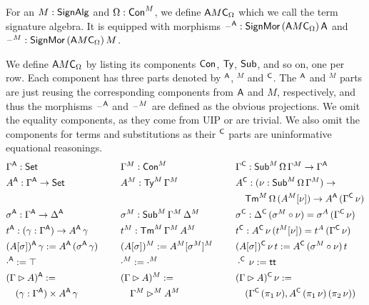 \documentclass[a4paper,UKenglish,cleveref, autoref]{lipics-v2019}
\begin{document}
\begin{definition}
  For an $M:\mathsf{SignAlg}$ and $\Omega:\mathsf{Con}^M$, we define ${\mathsf{A} M\mathsf{C}}_\Omega$
  which we call the term signature algebra. It is equipped with
  morphisms $\mathord{\hspace{1pt}\text{--}\hspace{1pt}}^{\mathsf{A}} : \mathsf{SignMor}\,({\mathsf{A} M\mathsf{C}}_\Omega)\,\mathsf{A}$ and
  $\mathord{\hspace{1pt}\text{--}\hspace{1pt}}^M : \mathsf{SignMor}\,({\mathsf{A} M\mathsf{C}}_\Omega)\,M$.

  We define ${\mathsf{A} M\mathsf{C}}_\Omega$ by listing its components $\mathsf{Con}$, $\mathsf{Ty}$,
  $\mathsf{Sub}$, and so on, one per row. Each component has three parts
  denoted by $^{\mathsf{A}}$, $^M$ and $^{\mathsf{C}}$. The $^{\mathsf{A}}$ and $^M$ parts are just
  reusing the corresponding components from $\mathsf{A}$ and $M$,
  respectively, and thus the morphisms $\mathord{\hspace{1pt}\text{--}\hspace{1pt}}^{\mathsf{A}}$ and $\mathord{\hspace{1pt}\text{--}\hspace{1pt}}^M$ are
  defined as the obvious projections. We omit the equality components,
  as they come from UIP or are trivial. We also omit the components
  for terms and substitutions as their $^{\mathsf{C}}$ parts are uninformative
  equational reasonings.
  \begin{alignat*}{10}
    & \Gamma^\A:\Set && \hspace{0.4em} && \Gamma^M:\Con^M && \hspace{0.4em} && \Gamma^\C: \Sub^M\,\Omega\,\Gamma^M\ra \Gamma^\A \\
    & A^\A:\Gamma^\A\ra\Set && && A^M:\Ty^M\,\Gamma^M && && A^\C:(\nu:\Sub^M\,\Omega\,\Gamma^M)\ra \\
    & && && && && \hspace{1em} \Tm^M\,\Omega\,(A^M[\nu])\ra A^\A\,(\Gamma^\C\,\nu) \\
    & \sigma^\A:\Gamma^\A\ra\Delta^\A && && \sigma^M:\Sub^M\,\Gamma^M\,\Delta^M && && \sigma^\C:\Delta^\C\,(\sigma^M\circ\nu)=\sigma^A\,(\Gamma^\C\,\nu) \\
    & t^\A:(\gamma:\Gamma^\A)\ra A^\A\,\gamma && && t^M:\Tm^M\,\Gamma^M\,A^M && && t^\C : A^\C\,\nu\,(t^M[\nu])= t^A\,(\Gamma^\C\,\nu) \\
    & (A[\sigma])^\A\,\gamma := A^\A\,(\sigma^\A\,\gamma) && && (A[\sigma])^M := A^M[\sigma^M]^M && && (A[\sigma])^\C\,\nu\,t := A^\C\,(\sigma^M\circ\nu)\,t \\
    & \cdot^\A := \top && && \cdot^M := \cdot^M && && \cdot^\C\,\nu := \tt \\
    & (\Gamma\rhd A)^\A := && && (\Gamma\rhd A)^M :=  && && (\Gamma\rhd A)^\C\,\nu := \\
    & \hspace{1em} (\gamma:\Gamma^\A)\times A^\A\,\gamma && && \hspace{1em} \Gamma^M\rhd^M A^M && && \hspace{1em} (\Gamma^\C\,(\pi_1\,\nu), A^\C\,(\pi_1\,\nu)\,(\pi_2\,\nu)) \\

\end{alignat*}
\end{definition}
\end{document}
